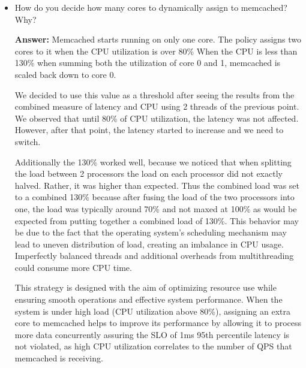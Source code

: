\begin{enumerate}
\begin{itemize}


    
    \item How do you decide how many cores to dynamically assign to memcached? Why?
    
    
    \textbf{Answer:}
     Memcached starts running on only one core. The policy assigns two cores to it when the CPU utilization is over 80\% When the CPU is less than 130\% when summing both the utilization of core 0 and 1, memcached is scaled back down to core 0.
 
     We decided to use this value as a threshold after seeing the results from the combined measure of latency and CPU using 2 threads of the previous point. We observed that until 80\% of CPU utilization, the latency was not affected. However, after that point, the latency started to increase and we need to switch.

     Additionally the 130\% worked well, because we noticed that when splitting the load between 2 processors the load on each processor did not exactly halved. Rather, it was higher than expected. Thus the combined load was set to a combined 130\% because after fusing the load of the two processors into one, the load was typically around 70\% and not maxed at 100\% as would be expected from putting together a combined load of 130\%. This behavior may be due to the fact that the operating system's scheduling mechanism may lead to uneven distribution of load, creating an imbalance in CPU usage. Imperfectly balanced threads and additional overheads from multithreading could consume more CPU time.
 
     This strategy is designed with the aim of optimizing resource use while ensuring smooth operations and effective system performance. When the system is under high load (CPU utilization above 80\%), assigning an extra core to memcached helps to improve its performance by allowing it to process more data concurrently assuring the SLO of 1ms 95th percentile latency is not violated, as high CPU utilization correlates to the number of QPS that memcached is receiving.
     

\end{itemize}
\end{enumerate}
